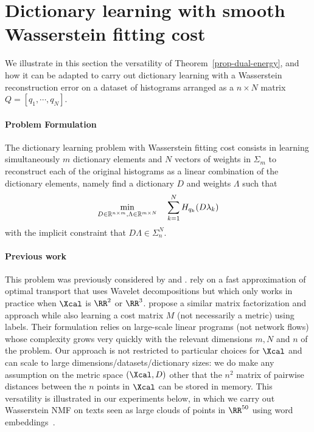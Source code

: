 \section{Dictionary learning with smooth Wasserstein fitting cost}\label{sec:nmf}
We illustrate in this section the versatility of Theorem~\ref{prop-dual-energy}, and how it can be adapted to carry out dictionary learning with a Wasserstein reconstruction error on a dataset of histograms arranged as a $n\times N$ matrix $Q=[q_1,\cdots,q_N]$.

\paragraph{Problem Formulation}
The dictionary learning problem with Wasserstein fitting cost consists in learning simultaneously $m$ dictionary elements and $N$ vectors of weights in $\Sigma_m$ to reconstruct each of the original histograms as a linear combination of the dictionary elements, namely find a dictionary $D$ and weights $\Lambda$ such that
\begin{equation}
\label{eq:DL} 
\begin{tabular}{ll}
$\displaystyle\min_{D\in\mathbb{R}^{n\times m},\Lambda\in\mathbb{R}^{m\times N}}$& $\displaystyle\sum_{k=1}^N H_{q_k}(D\lambda_k)$
\end{tabular}
\end{equation}
with the implicit constraint that $D\Lambda\in\Sigma_n^N$. 

\paragraph{Previous work} This problem was previously considered by \cite{sandler2009} and \cite{zen2014simultaneous}. \cite{sandler2009} rely on a fast approximation of optimal transport that uses Wavelet decompositions \cite{shirdhonkar2008approximate} but which only works in practice when $\Xcal$ is $\RR^2$ or $\RR^3$. \cite{zen2014simultaneous} propose a similar matrix factorization and approach while also learning a cost matrix $M$ (not necessarily a metric) using labels. Their formulation relies on large-scale linear programs (not network flows) whose complexity grows very quickly with the relevant dimensions $m,N$ and $n$ of the problem. Our approach is not restricted to particular choices for $\Xcal$ and can scale to large dimensions/datasets/dictionary sizes: we do make any assumption on the metric space $(\Xcal,D)$ other that the $n^2$ matrix of pairwise distances between the $n$ points in $\Xcal$ can be stored in memory. This versatility is illustrated  in our experiments below, in which we carry out Wasserstein NMF on texts seen as large clouds of points in $\RR^{50}$ using word embeddings~\cite{pennington2014glove,zou2013}.

